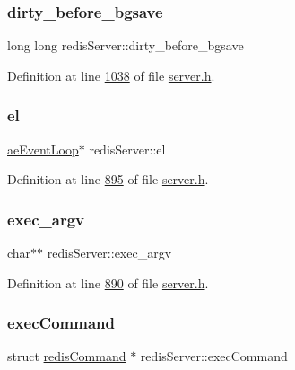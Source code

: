 \subsubsection{\texorpdfstring{dirty\+\_\+before\+\_\+bgsave}{dirty\_before\_bgsave}}
{\footnotesize\ttfamily long long redis\+Server\+::dirty\+\_\+before\+\_\+bgsave}



Definition at line \hyperlink{server_8h_source_l01038}{1038} of file \hyperlink{server_8h_source}{server.\+h}.

\mbox{\label{structredisServer_a43daacdc2a7c82767c2ac09db1e2d35b}} 
\subsubsection{\texorpdfstring{el}{el}}
{\footnotesize\ttfamily \hyperlink{structaeEventLoop}{ae\+Event\+Loop}$\ast$ redis\+Server\+::el}



Definition at line \hyperlink{server_8h_source_l00895}{895} of file \hyperlink{server_8h_source}{server.\+h}.

\mbox{\label{structredisServer_a710db896bdd86fe44a856991a09f5366}} 
\subsubsection{\texorpdfstring{exec\+\_\+argv}{exec\_argv}}
{\footnotesize\ttfamily char$\ast$$\ast$ redis\+Server\+::exec\+\_\+argv}



Definition at line \hyperlink{server_8h_source_l00890}{890} of file \hyperlink{server_8h_source}{server.\+h}.

\mbox{\label{structredisServer_a06c54efe5b1bf438910b34c490e8e7ae}} 
\subsubsection{\texorpdfstring{exec\+Command}{execCommand}}
{\footnotesize\ttfamily struct \hyperlink{structredisCommand}{redis\+Command} $\ast$ redis\+Server\+::exec\+Command}



